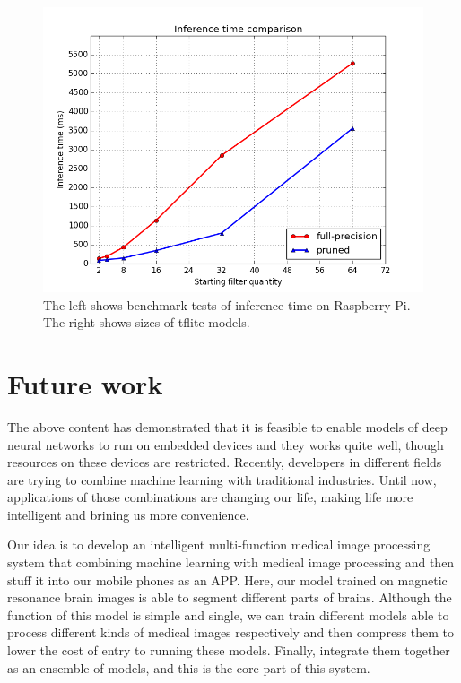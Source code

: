 \documentclass[sigconf]{acmart}
\begin{document}
\begin{figure}
  \centering
  \includegraphics[width=15cm]{fig5.png}
    \caption{The left shows benchmark tests of inference time on Raspberry Pi. The right shows sizes of tflite models.}
  \label{fig:fig5}
\end{figure}

\section{Future work}
The above content has demonstrated that it is feasible to enable models of deep neural networks to run on embedded devices and they works quite well, though resources on these devices are restricted. Recently, developers in different fields are trying to combine machine learning with traditional industries. Until now, applications of those combinations are changing our life, making life more intelligent and brining us more convenience. 

Our idea is to develop an intelligent multi-function medical image processing system that combining machine learning with medical image processing and then stuff it into our mobile phones as an APP. Here, our model trained on magnetic resonance brain images is able to segment different parts of brains. Although the function of this model is simple and single, we can train different models able to process different kinds of medical images respectively and then compress them to lower the cost of entry to running these models. Finally, integrate them together as an ensemble of models, and this is the core part of this system.
\end{document}
